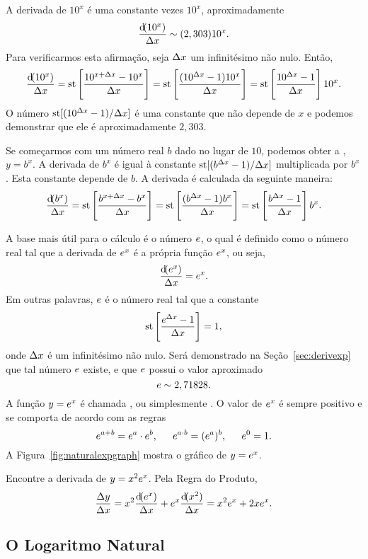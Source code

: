 A derivada de $10^x$ é uma constante vezes $10^x$, aproximadamente
$$
  \frac{\dif(10^x)}{\dx} \sim (2,303)10^x.
$$
Para verificarmos esta afirmação, seja $\Delta x$ um infinitésimo não nulo.
Então,
$$
  \frac{\dif(10^x)}{\dx} = \std\left[\frac{10^{x + \Dx} - 10^x}{\Dx}\right]
    = \std\left[\frac{(10^{\Dx} - 1)10^x}{\Dx}\right]
    = \std\left[\frac{10^{\Dx} - 1}{\Dx}\right]10^x.
$$
O número $\operatorname{st}[(10^{\Delta x} - 1)/\Delta x]$ é uma constante que não depende de $x$ e
podemos demonstrar que ele é aproximadamente $2,303$.

Se começarmos com um número real $b$ dado no lugar de $10$, podemos obter
a ,
$y = b^x$. A derivada de $b^x$ é igual à constante $\operatorname{st}[(b^{\Delta x} - 1)/\Delta x]$
multiplicada por $b^x$. Esta constante depende de $b$. A derivada é calculada
da seguinte maneira:
$$
  \frac{\dif(b^x)}{\dx} = \std\left[\frac{b^{x + \Dx} - b^x}{\Dx}\right]
    = \std\left[\frac{(b^{\Dx} - 1)b^x}{\Dx}\right]
    = \std\left[\frac{b^{\Dx} - 1}{\Dx}\right]b^x.
$$

A base mais útil para o cálculo é o número $e$, o qual é definido como
o número real tal que a derivada de $e^x$ é a própria função $e^x$, ou
seja,
$$
  \frac{\dif(\e^x)}{\dx} = \e^x.
$$
Em outras palavras, $e$ é o número real tal que a constante
$$
  \operatorname{st}\left[ \frac{e^{\Delta x}-1}{\Delta x} \right] = 1,
$$
onde $\Delta x$ é um infinitésimo não nulo. Será demonstrado na
Seção~\ref{sec:derivexp} que tal número $e$ existe, e que $e$ possui
o valor aproximado
$$
  e \sim 2,71828.
$$
A função $y = e^x$ é chamada , ou simplesmente . O valor
de $e^x$ é sempre positivo e se comporta de acordo com as regras
$$
  e^{a+b} = e^a \cdot e^b, \hspace{1.5em}
  e^{a \cdot b} = (e^a)^b, \hspace{1.5em}
  e^0 = 1.
$$
A Figura~\ref{fig:naturalexpgraph} mostra o gráfico de $y = e^x$.


\begin{example}
Encontre a derivada de $y = x^2 e^x$. Pela Regra do Produto,
$$
  \frac{\dy}{\dx} = x^2 \frac{\dif(\e^x)}{\dx} +
    \e^x \frac{\dif(x^2)}{\dx} = x^2 \e^x + 2x \e^x.
$$
\end{example}

\subsection{O Logaritmo Natural}

